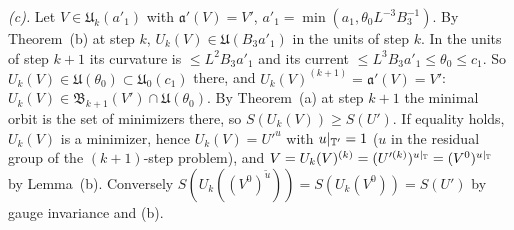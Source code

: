 \begin{detail}
\begin{step}
\end{step}
\begin{step}
\emph{(c).} Let $V\in\mathfrak U_k(a'_1)$ with $\mathfrak a'(V)=V'$, $a'_1=\min(a_1,\theta_0L^{-3}B_3^{-1})$. By Theorem~(b) at step $k$, $U_k(V)\in\mathfrak U(B_3a'_1)$ in the units of step $k$. In the units of step $k+1$ its curvature is $\le L^2B_3a'_1$ and its current $\le L^3B_3a'_1\le\theta_0\le c_1$. So $U_k(V)\in\mathfrak U(\theta_0)\subset\mathfrak U_0(c_1)$ there, and $U_k(V)^{(k+1)}=\mathfrak a'(V)=V'$: $U_k(V)\in\mathfrak B_{k+1}(V')\cap\mathfrak U(\theta_0)$. By Theorem~(a) at step $k+1$ the minimal orbit is the set of minimizers there, so $S(U_k(V))\ge S(U')$. If equality holds, $U_k(V)$ is a minimizer, hence $U_k(V)=U'^u$ with $u|_{\mathbb T'}=1$ ($u$ in the residual group of the $(k+1)$-step problem), and $V=U_k(V)^{(k)}=(U'^{(k)})^{u|_\mathbb T}=(V^0)^{u|_\mathbb T}$ by Lemma~(b). Conversely $S(U_k((V^0)^{\tilde u}))=S(U_k(V^0))=S(U')$ by gauge invariance and (b).
\end{step}
\end{detail}

